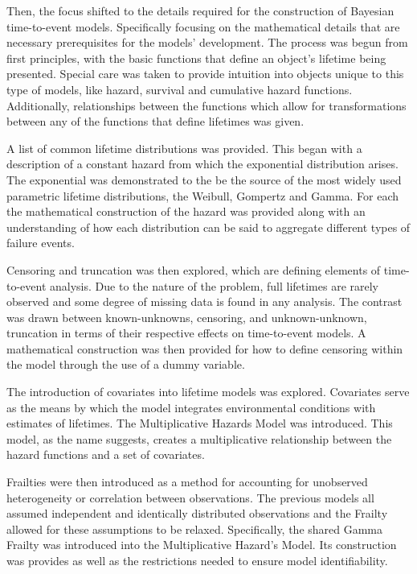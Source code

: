 Then, the focus shifted to the details required for the construction of Bayesian time-to-event models. Specifically focusing on the mathematical details that are necessary prerequisites for the models' development. The process was begun from first principles, with the basic functions that define an object's lifetime being presented. Special care was taken to provide intuition into objects unique to this type of models, like hazard, survival and cumulative hazard functions. Additionally, relationships between the functions which allow for transformations between any of the functions that define lifetimes was given.

A list of common lifetime distributions was provided. This began with a description of a constant hazard from which the exponential distribution arises. The exponential was demonstrated to the be the source of the most widely used parametric lifetime distributions, the Weibull, Gompertz and Gamma. For each the mathematical construction of the hazard was provided along with an understanding of how each distribution can be said to aggregate different types of failure events. 

Censoring and truncation was then explored, which are defining elements of time-to-event analysis. Due to the nature of the problem, full lifetimes are rarely observed and some degree of missing data is found in any analysis. The contrast was drawn between known-unknowns, censoring, and unknown-unknown, truncation in terms of their respective effects on time-to-event models. A mathematical construction was then provided for how to define censoring within the model through the use of a dummy variable. 

The introduction of covariates into lifetime models was explored. Covariates serve as the means by which the model integrates environmental conditions with estimates of lifetimes. The Multiplicative Hazards Model was introduced. This model, as the name suggests, creates a multiplicative relationship between the hazard functions and a set of covariates. 

Frailties were then introduced as a method for accounting for unobserved heterogeneity or correlation between observations. The previous models all assumed independent and identically distributed observations and the Frailty allowed for these assumptions to be relaxed. Specifically, the shared Gamma Frailty was introduced into the Multiplicative Hazard's Model. Its construction was provides as well as the restrictions needed to ensure model identifiability. 

